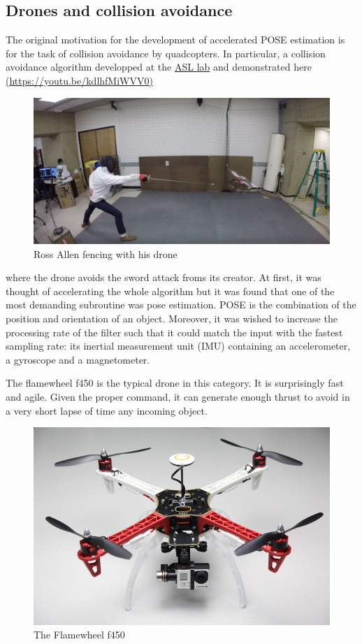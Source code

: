\documentclass[]{article}
\begin{document}
\subsection{Drones and collision
avoidance}\label{drones-and-collision-avoidance}

The original motivation for the development of accelerated POSE
estimation is for the task of collision avoidance by quadcopters. In
particular, a collision avoidance algorithm developped at the
\href{https://asl.stanford.edu/}{ASL lab} and demonstrated here
\href{https://www.youtube.com/watch?v=kdlhfMiWVV0}{(https://youtu.be/kdlhfMiWVV0)}

\begin{figure}
\centering
\includegraphics{fencing.png}
\caption{Ross Allen fencing with his drone}
\end{figure}

where the drone avoids the sword attack froms its creator. At first, it
was thought of accelerating the whole algorithm but it was found that
one of the most demanding subroutine was pose estimation. POSE is the
combination of the position and orientation of an object. Moreover, it
was wished to increase the processing rate of the filter such that it
could match the input with the fastest sampling rate: its inertial
measurement unit (IMU) containing an accelerometer, a gyroscope and a
magnetometer.

The flamewheel f450 is the typical drone in this category. It is
surprisingly fast and agile. Given the proper command, it can generate
enough thrust to avoid in a very short lapse of time any incoming
object.

\begin{figure}
\centering
\includegraphics{f450.jpg}
\caption{The Flamewheel f450}
\end{figure}
\end{document}
